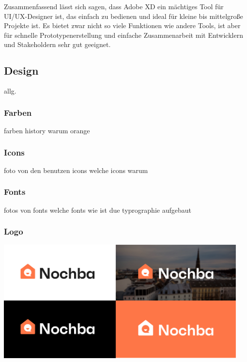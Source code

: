 Zusammenfassend lässt sich sagen, dass Adobe XD ein mächtiges Tool für UI/UX-Designer ist, das einfach zu bedienen und ideal für kleine bis mittelgroße Projekte ist. Es bietet zwar nicht so viele Funktionen wie andere Tools, ist aber für schnelle Prototypenerstellung und einfache Zusammenarbeit mit Entwicklern und Stakeholdern sehr gut geeignet.

\subsection{Design}
allg.


\subsubsection{Farben}
farben history
warum orange
\subsubsection{Icons}
foto von den benutzen icons
welche icons
warum
\subsubsection{Fonts}
fotos von fonts
welche fonts
wie ist due typrographie aufgebaut
\subsubsection{Logo}

\includegraphics[width=0.95\textwidth]{pics/final-logo.png}

